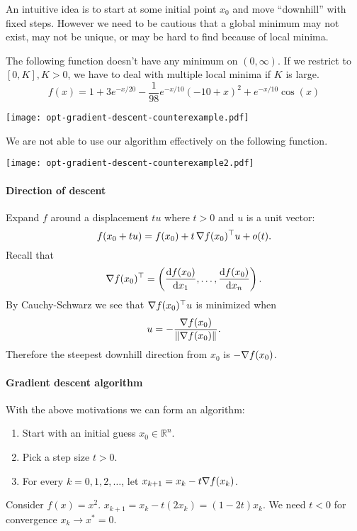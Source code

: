 An intuitive idea is to start at some initial point $x_0$ and move ``downhill'' with fixed steps. However we need to be cautious that a global minimum may not exist, may not be unique, or may be hard to find because of local minima. 

\begin{example}
    The following function doesn't have any minimum on $ (0,\infty) $. If we restrict to $ [0,K],K> 0 $, we have to deal with multiple local minima if $K$ is large. 
    \[
        f(x) = 1+3 e^{-x / 2 0}-\frac{1}{98} e^{-x / 1 0}(-10+x)^2+e^{-x / 1 0} \cos (x)
    \]
    \begin{center}
        \texttt{[image: opt-gradient-descent-counterexample.pdf]}
    \end{center}
\end{example}
\begin{example}
    We are not able to use our algorithm effectively on the following function. 
    \begin{center}
        \vspace*{-2.5em}
        \texttt{[image: opt-gradient-descent-counterexample2.pdf]}
    \end{center}
\end{example}

\paragraph{Direction of descent} 
Expand $f$ around a displacement $t u$ where $t>0$ and $u$ is a unit vector: 
\[
    f(x_0 + tu) = f(x_0) + t\, \nabla f(x_0)^\top u + o(t).
\] 
Recall that 
\[
    \nabla f(x_0) ^\top = \left( \frac{\mathrm{d}f(x_0)}{\mathrm{d}x_1},\dots, \frac{\mathrm{d}f(x_0)}{\mathrm{d}x_n}   \right). 
\]
By Cauchy-Schwarz we see that $ \nabla f(x_0)^\top u $ is minimized when 
\[
    u = -\frac{\nabla f(x_0)}{\left\| \nabla f(x_0) \right\|}.
\]
Therefore the steepest downhill direction from $x_0$ is $ - \nabla f(x_0) $.

\paragraph{Gradient descent algorithm}
With the above motivations we can form an algorithm: 
\begin{framed}\vspace{-0.4em}
\begin{enumerate}
    \item Start with an initial guess $x_0\in \mathbb{R}^{n}$.
    \item Pick a step size $t>0$. 
    \item For every $k=0,1,2,\dots$, let $ x_{k+1} = x_k - t \nabla f(x_k) $.
\end{enumerate}
\end{framed}
\begin{example}
    Consider $ f(x)=x^2 $. $ x_{k+1} = x_k - t(2x_k) = (1-2t)x_k $. We need $ t<0 $ for convergence $ x_k\to x^* = 0 $.
\end{example}

